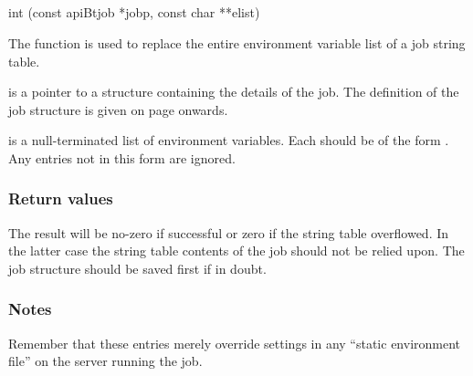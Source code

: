 \subsection{\funcnameXBputenvlist{}}

\begin{expara}

int \funcnameXBputenvlist{}(const apiBtjob *jobp, const char **elist)

\end{expara}

The function \funcXBputenv{} is used to replace the entire environment variable list of a job string table.

 is a pointer to a structure containing the details of the job. The definition of the job structure is given on
page \pageref{bkm:Jobstructure} onwards.

 is a null-terminated list of environment variables. Each should be of the form
. Any entries not in this form are ignored.

\subsubsection{Return values}
The result will be no-zero if successful or zero if the string table overflowed. In the latter case the string table contents of the job
should not be relied upon. The job structure should be saved first if in doubt.

\subsubsection{Notes}
Remember that these entries merely override settings in any ``static environment file'' on the server running the job.

